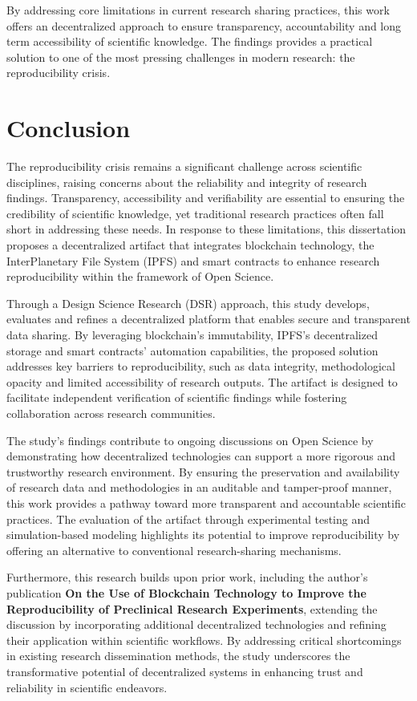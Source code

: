 \documentclass{article}
\begin{document}
By addressing core limitations in current research sharing practices, this work offers an decentralized approach to ensure transparency, accountability and long term accessibility of scientific knowledge. The findings provides a practical solution to one of the most pressing challenges in modern research: the reproducibility crisis.

\section{Conclusion}

The reproducibility crisis remains a significant challenge across scientific disciplines, raising concerns about the reliability and integrity of research findings. Transparency, accessibility and verifiability are essential to ensuring the credibility of scientific knowledge, yet traditional research practices often fall short in addressing these needs. In response to these limitations, this dissertation proposes a decentralized artifact that integrates blockchain technology, the InterPlanetary File System (IPFS) and smart contracts to enhance research reproducibility within the framework of Open Science.

Through a Design Science Research (DSR) approach, this study develops, evaluates and refines a decentralized platform that enables secure and transparent data sharing. By leveraging blockchain’s immutability, IPFS’s decentralized storage and smart contracts’ automation capabilities, the proposed solution addresses key barriers to reproducibility, such as data integrity, methodological opacity and limited accessibility of research outputs. The artifact is designed to facilitate independent verification of scientific findings while fostering collaboration across research communities.

The study’s findings contribute to ongoing discussions on Open Science by demonstrating how decentralized technologies can support a more rigorous and trustworthy research environment. By ensuring the preservation and availability of research data and methodologies in an auditable and tamper-proof manner, this work provides a pathway toward more transparent and accountable scientific practices. The evaluation of the artifact through experimental testing and simulation-based modeling highlights its potential to improve reproducibility by offering an alternative to conventional research-sharing mechanisms.

Furthermore, this research builds upon prior work, including the author’s publication \textbf{On the Use of Blockchain Technology to Improve the Reproducibility of Preclinical Research Experiments}, extending the discussion by incorporating additional decentralized technologies and refining their application within scientific workflows. By addressing critical shortcomings in existing research dissemination methods, the study underscores the transformative potential of decentralized systems in enhancing trust and reliability in scientific endeavors.
\end{document}
